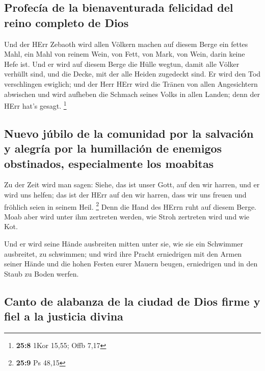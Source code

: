 \hypertarget{profecuxeda-de-la-bienaventurada-felicidad-del-reino-completo-de-dios}{%
\subsection{Profecía de la bienaventurada felicidad del reino completo
de
Dios}\label{profecuxeda-de-la-bienaventurada-felicidad-del-reino-completo-de-dios}}

 Und der HErr Zebaoth wird allen Völkern machen auf diesem
Berge ein fettes Mahl, ein Mahl von reinem Wein, von Fett, von Mark, von
Wein, darin keine Hefe ist.  Und er wird auf diesem Berge
die Hülle wegtun, damit alle Völker verhüllt sind, und die Decke, mit
der alle Heiden zugedeckt sind.  Er wird den Tod
verschlingen ewiglich; und der Herr HErr wird die Tränen von allen
Angesichtern abwischen und wird aufheben die Schmach seines Volks in
allen Landen; denn der HErr hat's gesagt. \footnote{\textbf{25:8} 1Kor
  15,55; Offb 7,17}

\hypertarget{nuevo-juxfabilo-de-la-comunidad-por-la-salvaciuxf3n-y-alegruxeda-por-la-humillaciuxf3n-de-enemigos-obstinados-especialmente-los-moabitas}{%
\subsection{Nuevo júbilo de la comunidad por la salvación y alegría por
la humillación de enemigos obstinados, especialmente los
moabitas}\label{nuevo-juxfabilo-de-la-comunidad-por-la-salvaciuxf3n-y-alegruxeda-por-la-humillaciuxf3n-de-enemigos-obstinados-especialmente-los-moabitas}}

 Zu der Zeit wird man sagen: Siehe, das ist unser Gott,
auf den wir harren, und er wird uns helfen; das ist der HErr auf den wir
harren, dass wir uns freuen und fröhlich seien in seinem Heil.
\footnote{\textbf{25:9} Ps 48,15}  Denn die Hand des
HErrn ruht auf diesem Berge. Moab aber wird unter ihm zertreten werden,
wie Stroh zertreten wird und wie Kot.

 Und er wird seine Hände ausbreiten mitten unter sie, wie
sie ein Schwimmer ausbreitet, zu schwimmen; und wird ihre Pracht
erniedrigen mit den Armen seiner Hände  und die hohen
Festen eurer Mauern beugen, erniedrigen und in den Staub zu Boden
werfen.

\hypertarget{canto-de-alabanza-de-la-ciudad-de-dios-firme-y-fiel-a-la-justicia-divina}{%
\subsection{Canto de alabanza de la ciudad de Dios firme y fiel a la
justicia
divina}\label{canto-de-alabanza-de-la-ciudad-de-dios-firme-y-fiel-a-la-justicia-divina}}

